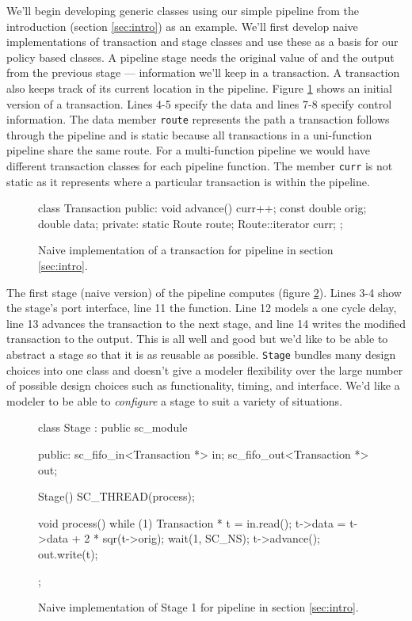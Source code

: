 \documentclass{entcs}
\begin{document}
We'll begin developing generic classes using our simple pipeline from the
introduction (section \ref{sec:intro}) as an example. We'll first develop naive implementations of
transaction and stage classes and use these as a basis for our policy based classes.
A pipeline stage needs the original value of
 and the output from the previous stage --- information we'll keep in a transaction.
A transaction also keeps track of its current location in the pipeline.
Figure \ref{fig:trans1} shows an initial version of a transaction. Lines 4-5 specify the data and
lines 7-8 specify control information. The data member {\tt route}
represents the path a transaction follows through the pipeline and is static
because all transactions in a uni-function pipeline share the same route. For a multi-function
pipeline we would have different transaction classes for each pipeline function.
The member {\tt curr} is not static as it represents where a
particular transaction is within the pipeline.
\begin{figure}
\begin{listing}{1}
class Transaction {
public:
   void advance() { curr++; }
   const double orig;
   double data;
private:
   static Route route;
   Route::iterator curr;
};
\end{listing}
\caption{\label{fig:trans1} Naive implementation of a transaction for pipeline in section \ref{sec:intro}.}
\end{figure}

The first stage (naive version) of the pipeline computes  (figure \ref{fig:stage1}).
Lines 3-4 show the stage's port interface, line 11 the function.
Line 12 models a one cycle delay, line 13 advances the transaction to the next stage,
and line 14 writes the modified transaction to the output.
This is all well and good but we'd like to
be able to abstract a stage so that it is as reusable as possible. {\tt Stage}
bundles many design choices into one class and doesn't give a modeler flexibility over
the large number of possible design choices such as functionality, timing, and interface. We'd like
a modeler to be able to {\em configure} a stage to suit a variety of situations.

\begin{figure}
\begin{listing}{1}
class Stage : public sc_module {
public:
  sc_fifo_in<Transaction *> in;
  sc_fifo_out<Transaction *> out;

  Stage() { SC_THREAD(process); }

  void process() {
    while (1) {
      Transaction * t = in.read();
      t->data = t->data + 2 * sqr(t->orig);
      wait(1, SC_NS);
      t->advance();
      out.write(t);
    }
  }
};
\end{listing}
\caption{\label{fig:stage1} Naive implementation of Stage 1 for pipeline in section \ref{sec:intro}.}
\end{figure}
\end{document}
